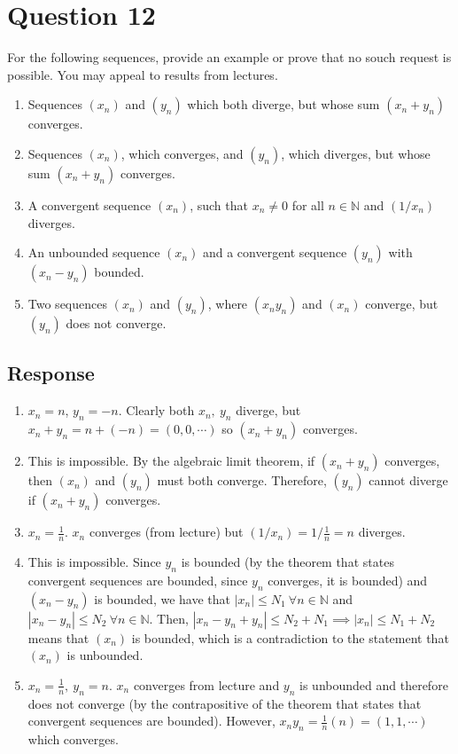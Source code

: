 \documentclass[13pt]{article}
\begin{document}
\newpage
\section*{Question 12}
For the following sequences, provide an example or prove that no souch
request is possible. You may appeal to results from lectures.
\begin{enumerate}[label=(\alph*)]
\item Sequences $(x_n)$ and $(y_n)$ which both diverge, but whose sum
  $(x_n + y_n)$ converges.
\item Sequences $(x_n)$, which converges, and $(y_n)$, which diverges,
  but whose sum $(x_n + y_n)$ converges.
\item A convergent sequence $(x_n)$, such that $x_n \neq 0$ for all $n
  \in \mathbb{N}$ and $(1/x_n)$ diverges.
\item An unbounded sequence $(x_n)$ and a convergent sequence $(y_n)$
  with $(x_n - y_n)$ bounded.
\item Two sequences  $(x_n)$ and $(y_n)$, where $(x_ny_n)$ and
  $(x_n)$ converge, but $(y_n)$ does not converge.
\end{enumerate}

\subsection*{Response}
\begin{enumerate}[label=(\alph*)]
\item $x_n = n$, $y_n = -n$. Clearly both $x_n, \ y_n$ diverge, but
  $x_n + y_n = n + (-n) = (0, 0, \cdots)$ so $(x_n + y_n)$ converges.
  
\item This is impossible. By the algebraic limit theorem, if $(x_n +
  y_n)$ converges, then $(x_n)$ and $(y_n)$ must both converge. Therefore,
  $(y_n)$ cannot diverge if $(x_n + y_n)$ converges.

\item $x_n = \frac{1}{n}$. $x_n$ converges (from
  lecture) but $(1/x_n) = 1/\frac{1}{n} = n$ diverges.

\item This is impossible. Since $y_n$ is bounded (by the theorem that
  states convergent sequences are bounded, since $y_n$ converges, it
  is bounded) and $(x_n - y_n)$ is bounded, we have that $|x_n| \leq
  N_1 \ \forall n \in \mathbb{N}$ and $|x_n - y_n| \leq N_2 \ \forall n \in
  \mathbb{N}$. Then, $|x_n - y_n + y_n| \leq N_2 + N_1 \implies |x_n|
  \leq N_1 + N_2$ means that $(x_n)$ is bounded, which is a
  contradiction to the statement that $(x_n)$ is unbounded. 
  
\item $x_n = \frac{1}{n}, \ y_n = n$. $x_n$ converges from lecture and
  $y_n$ is unbounded and therefore does not converge (by the
  contrapositive of the theorem that states that convergent sequences
  are bounded). However, $x_ny_n = \frac{1}{n}(n) = (1, 1, \cdots)$
  which converges. 
\end{enumerate}
\end{document}
